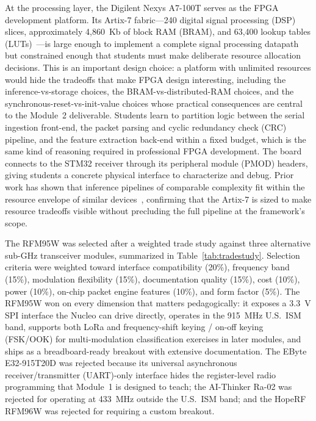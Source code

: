 \documentclass[conference]{IEEEtran}
\begin{document}
At the processing layer, the Digilent Nexys A7-100T serves as the FPGA development platform. Its Artix-7 fabric---240 digital signal processing (DSP) slices, approximately 4,860~Kb of block RAM (BRAM), and 63,400 lookup tables (LUTs)~\cite{b11}---is large enough to implement a complete signal processing datapath but constrained enough that students must make deliberate resource allocation decisions. This is an important design choice: a platform with unlimited resources would hide the tradeoffs that make FPGA design interesting, including the inference-vs-storage choices, the BRAM-vs-distributed-RAM choices, and the synchronous-reset-vs-init-value choices whose practical consequences are central to the Module~2 deliverable. Students learn to partition logic between the serial ingestion front-end, the packet parsing and cyclic redundancy check (CRC) pipeline, and the feature extraction back-end within a fixed budget, which is the same kind of reasoning required in professional FPGA development. The board connects to the STM32 receiver through its peripheral module (PMOD) headers, giving students a concrete physical interface to characterize and debug. Prior work has shown that inference pipelines of comparable complexity fit within the resource envelope of similar devices~\cite{b1,b3}, confirming that the Artix-7 is sized to make resource tradeoffs visible without precluding the full pipeline at the framework's scope. %

The RFM95W was selected after a weighted trade study against three alternative sub-GHz transceiver modules, summarized in Table~\ref{tab:tradestudy}. Selection criteria were weighted toward interface compatibility (20\%), frequency band (15\%), modulation flexibility (15\%), documentation quality (15\%), cost (10\%), power (10\%), on-chip packet engine features (10\%), and form factor (5\%). The RFM95W won on every dimension that matters pedagogically: it exposes a 3.3~V SPI interface the Nucleo can drive directly, operates in the 915~MHz U.S.\ ISM band, supports both LoRa and frequency-shift keying / on-off keying (FSK/OOK) for multi-modulation classification exercises in later modules, and ships as a breadboard-ready breakout with extensive documentation. The EByte E32-915T20D was rejected because its universal asynchronous receiver/transmitter (UART)-only interface hides the register-level radio programming that Module~1 is designed to teach; the AI-Thinker Ra-02 was rejected for operating at 433~MHz outside the U.S.\ ISM band; and the HopeRF RFM96W was rejected for requiring a custom breakout.
\end{document}
